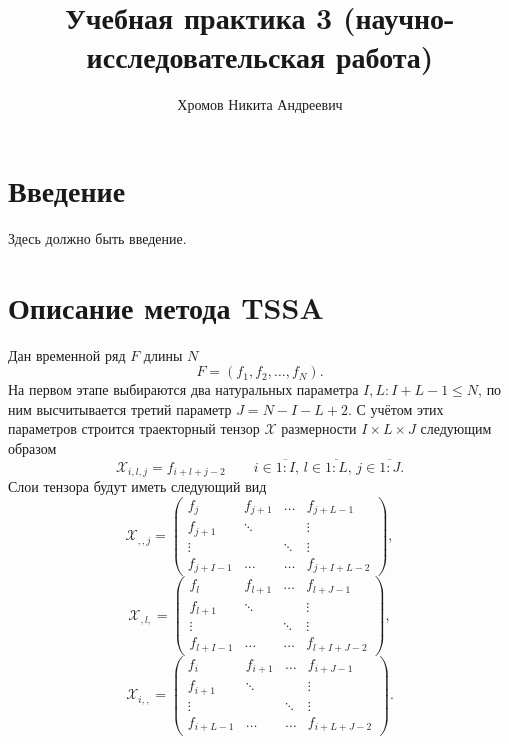 \documentclass[specialist,
    substylefile = spbu_report.rtx,
    subf,href,colorlinks=true, 12pt]{disser}
\theoremstyle{plain}
\theoremstyle{definition}
\theoremstyle{remark}
\begin{document}
    \title{Учебная практика 3 (научно-исследовательская работа)}
    \author{Хромов Никита Андреевич}
    \date{\number\year}
    \maketitle

    \tableofcontents


    \section{Введение}\label{sec:intro}
    Здесь должно быть введение.
    \newpage


    \section{Описание метода TSSA}\label{sec:tssa-method-description}
    Дан временной ряд $F$ длины $N$
    \[F=(f_1,f_2,\ldots,f_N).\]
    На первом этапе выбираются два натуральных параметра $I, L: I+L-1\leqslant N$, по ним высчитывается третий параметр $J=N-I-L+2$.
    С учётом этих параметров строится траекторный тензор $\mathcal X$ размерности $I\times L \times J$ следующим образом
    \[\mathcal{X}_{i,l,j}=f_{i+l+j-2}\qquad i\in \overline{1:I},\, l \in\overline{1:L},\, j \in\overline{1:J}.\]
    Слои тензора будут иметь следующий вид
    \[\mathcal{X}_{,,j}=
    \begin{pmatrix}
        f_j       & f_{j+1} & \ldots & f_{j+L-1}   \\
        f_{j+1}   & \ddots  &        & \vdots      \\
        \vdots    &         & \ddots & \vdots      \\
        f_{j+I-1} & \ldots  & \ldots & f_{j+I+L-2}
    \end{pmatrix},\]
    \[\mathcal{X}_{,l,}=
    \begin{pmatrix}
        f_l       & f_{l+1} & \ldots & f_{l+J-1}   \\
        f_{l+1}   & \ddots  &        & \vdots      \\
        \vdots    &         & \ddots & \vdots      \\
        f_{l+I-1} & \ldots  & \ldots & f_{l+I+J-2}
    \end{pmatrix},\]
    \[\mathcal{X}_{i,,}=
    \begin{pmatrix}
        f_i       & f_{i+1} & \ldots & f_{i+J-1}   \\
        f_{i+1}   & \ddots  &        & \vdots      \\
        \vdots    &         & \ddots & \vdots      \\
        f_{i+L-1} & \ldots  & \ldots & f_{i+L+J-2}
    \end{pmatrix}.\]
\end{document}
